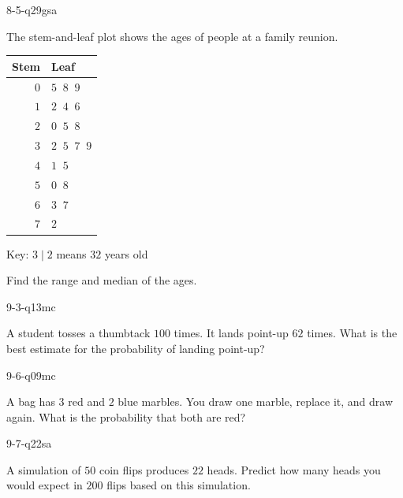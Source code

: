 \begin{practiceQuestion}{8-5-q29}{gsa}
\begin{questionText}
The stem-and-leaf plot shows the ages of people at a family reunion.

\begin{center}
\begin{tabular}{r|l}
\textbf{Stem} & \textbf{Leaf} \\
\hline
$0$ & $5\;\;8\;\;9$ \\
$1$ & $2\;\;4\;\;6$ \\
$2$ & $0\;\;5\;\;8$ \\
$3$ & $2\;\;5\;\;7\;\;9$ \\
$4$ & $1\;\;5$ \\
$5$ & $0\;\;8$ \\
$6$ & $3\;\;7$ \\
$7$ & $2$
\end{tabular}

Key: $3 \mid 2$ means $32$ years old
\end{center}

Find the range and median of the ages.
\end{questionText}
\end{practiceQuestion}

\begin{practiceQuestion}{9-3-q13}{mc}
\begin{questionText}
A student tosses a thumbtack $100$ times. It lands point-up $62$ times. What is the best estimate for the probability of landing point-up?
\end{questionText}
\end{practiceQuestion}

\begin{practiceQuestion}{9-6-q09}{mc}
\begin{questionText}
A bag has $3$ red and $2$ blue marbles. You draw one marble, replace it, and draw again. What is the probability that both are red?
\end{questionText}
\end{practiceQuestion}

\begin{practiceQuestion}{9-7-q22}{sa}
\begin{questionText}
A simulation of $50$ coin flips produces $22$ heads. Predict how many heads you would expect in $200$ flips based on this simulation.
\end{questionText}
\end{practiceQuestion}
